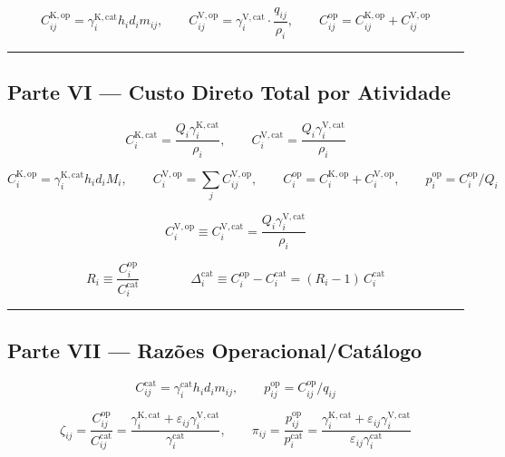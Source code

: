 \documentclass[
  10pt,
]{article}
\begin{document}
\[C_{ij}^{\mathrm{K,op}}=\gamma_i^{\mathrm{K,cat}}h_id_im_{ij}, \qquad C_{ij}^{\mathrm{V,op}}=\gamma_i^{\mathrm{V,cat}}\cdot\frac{q_{ij}}{\rho_i}, \qquad C_{ij}^{\mathrm{op}}=C_{ij}^{\mathrm{K,op}}+C_{ij}^{\mathrm{V,op}}\]

\begin{center}\rule{0.5\linewidth}{0.5pt}\end{center}

\hypertarget{parte-vi-custo-direto-total-por-atividade}{%
\subsection{Parte VI --- Custo Direto Total por
Atividade}\label{parte-vi-custo-direto-total-por-atividade}}

\[C_i^{\mathrm{K,cat}}=\frac{Q_i\gamma_i^{\mathrm{K,cat}}}{\rho_i}, \qquad C_i^{\mathrm{V,cat}}=\frac{Q_i\gamma_i^{\mathrm{V,cat}}}{\rho_i}\]

\[C_i^{\mathrm{K,op}}=\gamma_i^{\mathrm{K,cat}}h_id_iM_i, \qquad C_i^{\mathrm{V,op}}=\sum_jC_{ij}^{\mathrm{V,op}}, \qquad C_i^{\mathrm{op}}=C_i^{\mathrm{K,op}}+C_i^{\mathrm{V,op}}, \qquad p_i^{\mathrm{op}}=C_i^{\mathrm{op}}/Q_i\]

\[\boxed{C_i^{\mathrm{V,op}}\equiv C_i^{\mathrm{V,cat}} = \frac{Q_i\gamma_i^{\mathrm{V,cat}}}{\rho_i}}\]

\[R_i \equiv \frac{C_i^{\mathrm{op}}}{C_i^{\mathrm{cat}}} \qquad\qquad \boxed{\Delta_i^{\mathrm{cat}} \equiv C_i^{\mathrm{op}}-C_i^{\mathrm{cat}} = (R_i-1)\,C_i^{\mathrm{cat}}}\]

\begin{center}\rule{0.5\linewidth}{0.5pt}\end{center}

\hypertarget{parte-vii-razuxf5es-operacionalcatuxe1logo}{%
\subsection{Parte VII --- Razões
Operacional/Catálogo}\label{parte-vii-razuxf5es-operacionalcatuxe1logo}}

\[C_{ij}^{\mathrm{cat}}=\gamma_i^{\mathrm{cat}}h_id_im_{ij}, \qquad p_{ij}^{\mathrm{op}}=C_{ij}^{\mathrm{op}}/q_{ij}\]

\[\zeta_{ij}=\frac{C_{ij}^{\mathrm{op}}}{C_{ij}^{\mathrm{cat}}}=\frac{\gamma_i^{\mathrm{K,cat}}+\varepsilon_{ij}\gamma_i^{\mathrm{V,cat}}}{\gamma_i^{\mathrm{cat}}}, \qquad \pi_{ij}=\frac{p_{ij}^{\mathrm{op}}}{p_i^{\mathrm{cat}}}=\frac{\gamma_i^{\mathrm{K,cat}}+\varepsilon_{ij}\gamma_i^{\mathrm{V,cat}}}{\varepsilon_{ij}\gamma_i^{\mathrm{cat}}}\]
\end{document}
